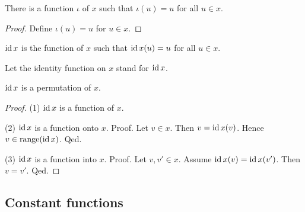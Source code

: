 \documentclass[../../set-theory.ftl.tex]{subfiles}
\begin{document}
  \begin{forthel}
    \begin{lemma}
      There is a function $\iota$ of $x$ such that $\iota(u) = u$ for all $u \in x$.
    \end{lemma}
    \begin{proof}
      Define $\iota(u) = u$ for $u \in x$.
    \end{proof}

    \begin{definition}
      $\operatorname{id}{x}$ is the function of $x$ such that $\operatorname{id}{x}(u) = u$ for all $u \in x$.
    \end{definition}

    Let the identity function on $x$ stand for $\operatorname{id}{x}$.

    \begin{proposition}\label{SetTheory_02_01_848243}
      $\operatorname{id}{x}$ is a permutation of $x$.
    \end{proposition}
    \begin{proof}
      (1) $\operatorname{id}{x}$ is a function of $x$.

      (2) $\operatorname{id}{x}$ is a function onto $x$.
      Proof.
        Let $v \in x$.
        Then $v = \operatorname{id}{x}(v)$.
        Hence $v \in \operatorname{range}(\operatorname{id}{x})$.
      Qed.

      (3) $\operatorname{id}{x}$ is a function into $x$.
      Proof.
        Let $v,v' \in x$.
        Assume $\operatorname{id}{x}(v) = \operatorname{id}{x}(v')$.
        Then $v = v'$.
      Qed.
    \end{proof}
  \end{forthel}


  \subsection{Constant functions}
\end{document}
